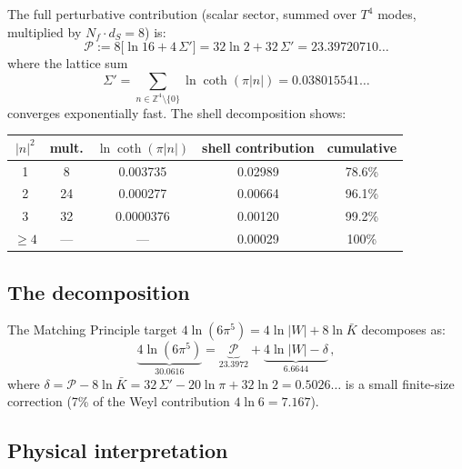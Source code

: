 \documentclass[11pt,a4paper]{article}
\begin{document}
The full perturbative contribution (scalar sector, summed over
$T^4$ modes, multiplied by $N_f\cdot d_S=8$) is:
\begin{equation}
  \mathcal{P} := 8\bigl[\ln 16 + 4\,\Sigma'\bigr]
  = 32\ln 2 + 32\,\Sigma'
  = 23.39720710\ldots
\end{equation}
where the lattice sum
\begin{equation}
  \Sigma' = \sum_{n\in\mathbb{Z}^4\setminus\{0\}}
    \ln\coth(\pi|n|) = 0.038015541\ldots
\end{equation}
converges exponentially fast.  The shell decomposition shows:
\begin{center}\small
\renewcommand{\arraystretch}{1.1}
\begin{tabular}{ccccc}
\toprule
$|n|^2$ & mult. & $\ln\coth(\pi|n|)$ & shell contribution & cumulative \\
\midrule
1 & 8 & 0.003735 & 0.02989 & 78.6\% \\
2 & 24 & 0.000277 & 0.00664 & 96.1\% \\
3 & 32 & 0.0000376 & 0.00120 & 99.2\% \\
$\geq 4$ & --- & --- & 0.00029 & 100\% \\
\bottomrule
\end{tabular}
\end{center}

\subsection{The decomposition}

The Matching Principle target $4\ln(6\pi^5)=4\ln|W|+8\ln\bar K$ decomposes as:
\begin{equation}\label{eq:decomp-supp}
  \underbrace{4\ln(6\pi^5)}_{30.0616}
  = \underbrace{\mathcal{P}}_{23.3972}
  + \underbrace{4\ln|W|-\delta}_{6.6644}\,,
\end{equation}
where $\delta = \mathcal{P}-8\ln\bar K = 32\,\Sigma' - 20\ln\pi + 32\ln 2
= 0.5026\ldots$ is a small finite-size correction (7\% of the
Weyl contribution $4\ln 6=7.167$).

\subsection{Physical interpretation}
\end{document}
